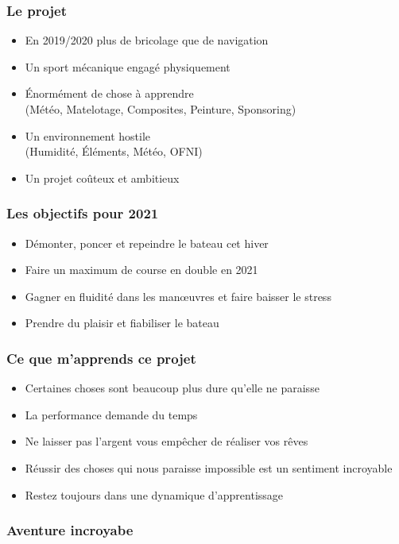 \documentclass{beamer}
\begin{document}
\begin{frame}
  \frametitle{Le projet}

  \begin{itemize}
    \item En 2019/2020 plus de bricolage que de navigation
    \pause \item Un sport mécanique engagé physiquement
    \pause \item Énormément de chose à apprendre\\ (Météo, Matelotage, Composites, Peinture, Sponsoring)
    \pause \item Un environnement hostile\\ (Humidité, Éléments, Météo, OFNI)
    \pause \item Un projet coûteux et ambitieux
  \end{itemize}

\end{frame}

\begin{frame}
  \frametitle{Les objectifs pour 2021}

  \begin{itemize}
    \item Démonter, poncer et repeindre le bateau cet hiver
    \pause \item Faire un maximum de course en double en 2021
    \pause \item Gagner en fluidité dans les manœuvres et faire baisser le stress
    \pause \item Prendre du plaisir et fiabiliser le bateau
  \end{itemize}
\end{frame}

\begin{frame}
  \frametitle{Ce que m'apprends ce projet}

  \begin{itemize}
    \item Certaines choses sont beaucoup plus dure qu'elle ne paraisse
    \pause \item La performance demande du temps
    \pause \item Ne laisser pas l'argent vous empêcher de réaliser vos rêves
    \pause \item Réussir des choses qui nous paraisse impossible est un sentiment incroyable
    \pause \item Restez toujours dans une dynamique d'apprentissage
  \end{itemize}
\end{frame}

\begin{frame}
  \frametitle{Aventure incroyabe}

\end{frame}
\end{document}

